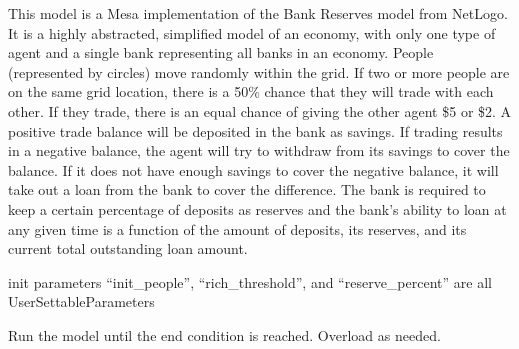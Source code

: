 \documentclass[letterpaper,10pt,english]{sphinxmanual}
\begin{document}
\begin{fulllineitems}
\label{\detokenize{index:examples.bank_reserves.bank_reserves.model.BankReserves}}
This model is a Mesa implementation of the Bank Reserves model from NetLogo.
It is a highly abstracted, simplified model of an economy, with only one
type of agent and a single bank representing all banks in an economy. People
(represented by circles) move randomly within the grid. If two or more people
are on the same grid location, there is a 50\% chance that they will trade with
each other. If they trade, there is an equal chance of giving the other agent
\$5 or \$2. A positive trade balance will be deposited in the bank as savings.
If trading results in a negative balance, the agent will try to withdraw from
its savings to cover the balance. If it does not have enough savings to cover
the negative balance, it will take out a loan from the bank to cover the
difference. The bank is required to keep a certain percentage of deposits as
reserves and the bank’s ability to loan at any given time is a function of
the amount of deposits, its reserves, and its current total outstanding loan
amount.

\begin{fulllineitems}
\label{\detokenize{index:examples.bank_reserves.bank_reserves.model.BankReserves.grid_w}}
init parameters “init\_people”, “rich\_threshold”, and “reserve\_percent”
are all UserSettableParameters

\end{fulllineitems}


\begin{fulllineitems}
\label{\detokenize{index:examples.bank_reserves.bank_reserves.model.BankReserves.run_model}}
Run the model until the end condition is reached. Overload as
needed.


\end{fulllineitems}
\end{fulllineitems}
\end{document}
